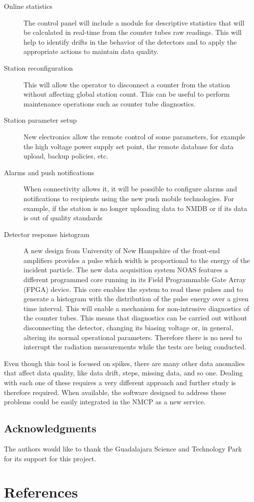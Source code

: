 \documentclass[a4paper]{jpconf}
\begin{document}
\begin{description}
    \item[Online statistics] The control panel will include a module for
        descriptive statistics that will be calculated in real-time from the
        counter tubes raw readings. This will help to identify drifts in the
        behavior of the detectors and to apply the appropriate actions to
        maintain data quality.
    \item[Station reconfiguration] This will allow the operator to disconnect a
        counter from the station without affecting global station count. This
        can be useful to perform maintenance operations such as counter tube
        diagnostics. 
    \item[Station parameter setup] New electronics allow the remote control of
        some parameters, for example the high voltage power supply set point,
        the remote database for data upload, backup policies, etc.
    \item[Alarms and push notifications] When connectivity allows it, it will
        be possible to configure alarms and notifications to recipients using
        the new push mobile technologies. For example, if the station is no
        longer uploading data to NMDB or if its data is out of quality
        standards
    \item[Detector response histogram] A new design from University of New
        Hampshire of the front-end amplifiers provides a pulse which width is
        proportional to the energy of the incident particle. The new data
        acquisition system NOAS features a different programmed core running in
        its Field Programmable Gate Array (FPGA) device. This core enables the
        system to read these pulses and to generate a histogram with the
        distribution of the pulse energy over a given time interval. This will
        enable a mechanism for non-intrusive diagnostics of the counter tubes.
        This means that diagnostics can be carried out without disconnecting the
        detector, changing its biasing voltage or, in general, altering its
        normal operational parameters. Therefore there is no need to interrupt
        the radiation measurements while the tests are being conducted.
\end{description}

Even though this tool is focused on spikes, there are many other data anomalies
that affect data quality, like data drift, steps, missing data, and so one.
Dealing with each one of these requires a very different approach and further
study is therefore required. When available, the software designed to address
these problems could be easily integrated in the NMCP as a new service.

\subsection*{Acknowledgments} 

The authors would like to thank the Guadalajara Science and Technology Park for
its support for this project.


\section*{References}
 
\end{document}
